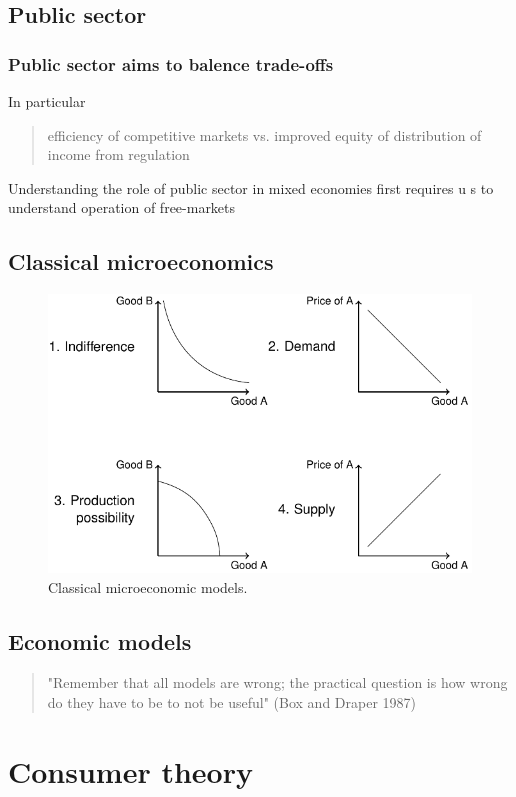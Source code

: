 \documentclass[class=report, crop=false, 12pt,a4paper]{standalone}
\begin{document}
\subsection{Public sector}
\subsubsection{Public sector aims to balence trade-offs}
In particular
\begin{quote}
	efficiency of competitive markets vs. improved equity of distribution of income from regulation
\end{quote}
Understanding the role of public sector in mixed economies first requires u s to understand operation of free-markets
\subsection{Classical microeconomics}
\begin{figure}[H]
	\centering
	\includegraphics[width = 0.9 \textwidth]{../img/figure3.png}
	\caption{Classical microeconomic models.}
\end{figure}
\subsection{Economic models}
\begin{quote}
	"Remember that all models are wrong; the practical question is how wrong do they have to be to not be useful" (Box and Draper 1987)
\end{quote}
\section{Consumer theory}
\end{document}
